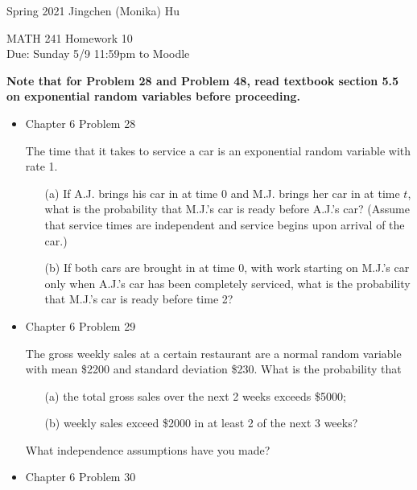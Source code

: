 \documentclass[11pt]{article}
\begin{document}
\enlargethispage{\baselineskip}

Spring 2021 \hfill Jingchen (Monika) Hu\\

\begin{center}
{\huge MATH 241 Homework 10}	\\
Due: Sunday 5/9 11:59pm to Moodle
\end{center}
\vspace{0.5cm}


{\bf Note that for Problem 28 and Problem 48, read textbook section 5.5 on exponential random variables before proceeding.}

\begin{itemize}

    \item
    Chapter 6 Problem 28
    
    The time that it takes to service a car is an exponential random variable with rate 1.
    
    \begin{itemize}
    \item[(a)] If A.J. brings his car in at time 0 and M.J. brings her car in at time $t$, what is the probability that M.J.'s car is ready before A.J.'s car? (Assume that service times are independent and service begins upon arrival of the car.)
    \item[(b)] If both cars are brought in at time 0, with work starting on M.J.'s car only when A.J.'s car has been completely serviced, what is the probability that M.J.'s car is ready before time 2?
    \end{itemize}
    
    \item
    Chapter 6 Problem  29
    
    The gross weekly sales at a certain restaurant are a normal random variable with mean \$2200 and standard deviation \$230. What is the probability that
    
    \begin{itemize}
    \item[(a)] the total gross sales over the next 2 weeks exceeds \$5000;
    \item[(b)] weekly sales exceed \$2000 in at least 2 of the next 3 weeks?
    \end{itemize}
    What independence assumptions have you made?

    \item
    Chapter 6 Problem  30
    

\end{itemize}
\end{document}

